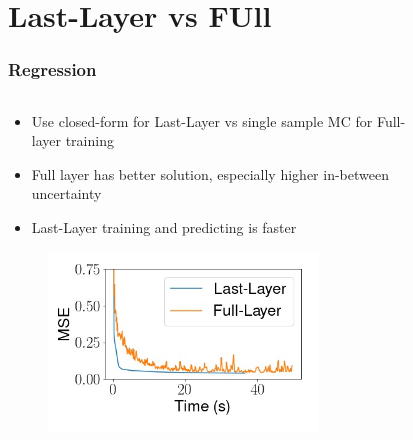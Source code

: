 \documentclass{beamer}
\begin{document}
        \section{Last-Layer vs FUll}
        \begin{frame}
            \frametitle{Regression}
            \begin{columns}
                \begin{column}{0.6\textwidth}
                \begin{itemize}
                    \item Use closed-form for Last-Layer vs single sample MC for Full-layer training
                    \item Full layer has better solution, especially higher in-between uncertainty
                    \item Last-Layer training and predicting is faster
                \end{itemize}
                \begin{figure}
                    \includegraphics[width=0.8\textwidth]{images/Regression/LLvsFullMSE.jpg}
                \end{figure}
                \end{column}
                \begin{column}{0.4\textwidth}
                    \begin{figure}
                        \vspace*{-2cm}

\end{figure}
\end{column}
\end{columns}
\end{frame}
\end{document}
